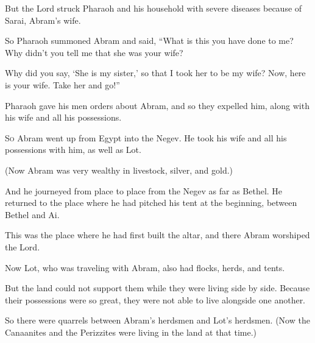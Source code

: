 \begin{scripture}
 But the Lord struck Pharaoh and his household with severe diseases because of Sarai, Abram's wife.
 So Pharaoh summoned Abram and said, ``What is this you have done to me? Why didn't you tell me that she was your wife?
 Why did you say, `She is my sister,' so that I took her to be my wife? Now, here is your wife. Take her and go!''
 Pharaoh gave his men orders about Abram, and so they expelled him, along with his wife and all his possessions.

 \allowchapbreak\hypertarget{ch-genesis-13}{}\lettrine[lines=5]{\color{pentateuch}S}{\textsc{o}} Abram went up from Egypt into the Negev. He took his wife and all his possessions with him, as well as Lot.\everypar{}
 (Now Abram was very wealthy in livestock, silver, and gold.)
\\\indent{} And he journeyed from place to place from the Negev as far as Bethel. He returned to the place where he had pitched his tent at the beginning, between Bethel and Ai.
 This was the place where he had first built the altar, and there Abram worshiped the Lord.
\everypar{}

 Now Lot, who was traveling with Abram, also had flocks, herds, and tents.
 But the land could not support them while they were living side by side. Because their possessions were so great, they were not able to live alongside one another.
 So there were quarrels between Abram's herdsmen and Lot's herdsmen. (Now the Canaanites and the Perizzites were living in the land at that time.)
\everypar{}


\end{scripture}
